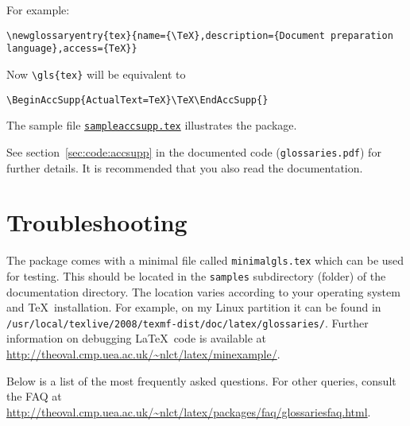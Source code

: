 \documentclass{nlctdoc}
\newcommand*{\samplefile}[1]{\hyperref[ex:sample#1]{\texttt{sample#1.tex}}}
\begin{document}
For example:
\begin{verbatim}
\newglossaryentry{tex}{name={\TeX},description={Document preparation
language},access={TeX}}
\end{verbatim}
Now \verb|\gls{tex}| will be equivalent to
\begin{verbatim}
\BeginAccSupp{ActualText=TeX}\TeX\EndAccSupp{}
\end{verbatim}
The sample file \samplefile{accsupp} illustrates the
 package.

See \ifpdf section~\ref*{sec:code:accsupp} in \fi the documented code
(\texttt{glossaries.pdf}) for further details. It is recommended
that you also read the  documentation. 

\section{Troubleshooting}
\label{sec:trouble}

The  package comes with a minimal file called 
\texttt{minimalgls.tex} which can be used for testing. This
should be located in the \texttt{samples} subdirectory (folder)
of the  documentation directory. The location
varies according to your operating system and \TeX\ installation.
For example, on my Linux partition it can be found in
\texttt{/usr/local/texlive/2008/texmf-dist/doc/latex/glossaries/}. 
Further information on debugging \LaTeX\ code is available at
\url{http://theoval.cmp.uea.ac.uk/~nlct/latex/minexample/}.

Below is a list of the most frequently asked questions. For
other queries, consult the  FAQ at
\url{http://theoval.cmp.uea.ac.uk/~nlct/latex/packages/faq/glossariesfaq.html}. 
\end{document}
